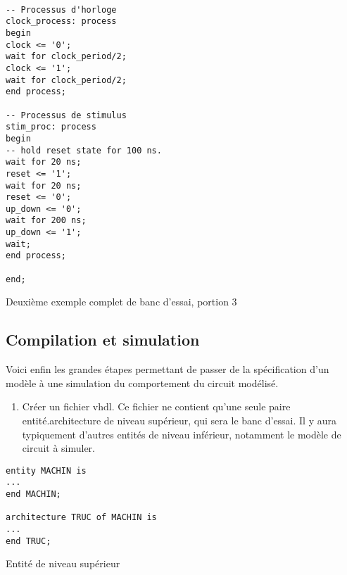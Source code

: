 \documentclass[11pt]{article}
\begin{document}
\begin{listing}[htbp]
\begin{verbatim}

-- Processus d'horloge
clock_process: process
begin
clock <= '0';
wait for clock_period/2;
clock <= '1';
wait for clock_period/2;
end process;

-- Processus de stimulus
stim_proc: process
begin
-- hold reset state for 100 ns.
wait for 20 ns;
reset <= '1';
wait for 20 ns;
reset <= '0';
up_down <= '0';
wait for 200 ns;
up_down <= '1';
wait;
end process;

end;
\end{verbatim}
\caption{Deuxième exemple complet de banc d'essai, portion 3}
\end{listing}


\subsection{Compilation et simulation}
\label{sec:org289c93e}

Voici enfin les grandes étapes permettant de passer de la spécification d'un
modèle à une simulation du comportement du circuit modélisé. 

\begin{enumerate}
\item Créer un fichier vhdl. Ce fichier ne contient qu'une seule paire
entité.architecture de niveau supérieur, qui sera le banc
d'essai. Il y aura typiquement d'autres entités de niveau
inférieur, notamment le modèle de circuit à simuler.
\end{enumerate}

\begin{listing}[htbp]
\begin{verbatim}
entity MACHIN is
...
end MACHIN;

architecture TRUC of MACHIN is
...
end TRUC;
\end{verbatim}
\caption{Entité de niveau supérieur}
\end{listing}
\end{document}

